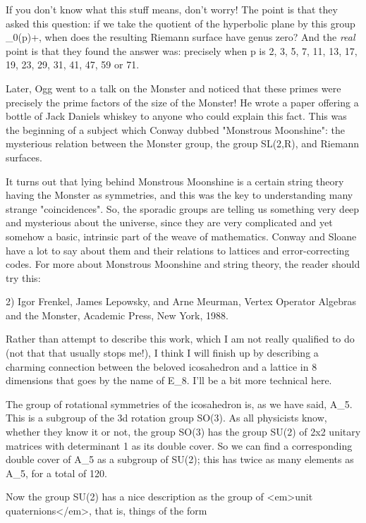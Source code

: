 If you don't know what this stuff means, don't worry! 
The point is that they asked this question: if we take the quotient of the 
hyperbolic plane by this group \Gamma _{0}(p)+, when does the resulting
Riemann surface have genus zero?  And the \emph{real} point
is that they found the answer was: precisely when p is 2, 3, 5, 7, 
11, 13, 17, 19, 23, 29, 31, 41, 47, 59 or 71. 

Later, Ogg went to a talk on the Monster and noticed that these
primes were precisely the prime factors of the size of the Monster!
He wrote a paper offering a bottle of Jack Daniels whiskey to 
anyone who could explain this fact.  This was the beginning of a 
subject which Conway dubbed "Monstrous Moonshine": 
the mysterious relation between the Monster group, the group 
SL(2,R), and Riemann surfaces.  

It turns out that lying behind Monstrous Moonshine is a certain
string theory having the Monster as symmetries, and this was
the key to understanding many strange "coincidences". 
So, the sporadic groups are telling us something very deep and
mysterious about the universe, since they are very complicated and yet
somehow a basic, intrinsic part of the weave of mathematics.  Conway
and Sloane have a lot to say about them and their relations to lattices
and error-correcting codes.   For more about Monstrous Moonshine
and string theory, the reader should try this:

2) Igor Frenkel, James Lepowsky, and Arne Meurman, Vertex Operator
Algebras and the Monster, Academic Press, New York, 1988.

Rather than attempt to describe this work, which I am not really
qualified to do (not that that usually stops me!), I think I will finish
up by describing a charming connection between the beloved icosahedron
and a lattice in 8 dimensions that goes by the name of E_{8}.
I'll be a bit more technical here.


The group of rotational symmetries of the icosahedron is, as we have
said, A_{5}.  This is a subgroup of the 3d rotation group SO(3).
As all physicists know, whether they know it or not, the group SO(3) has
the group SU(2) of 2x2 unitary matrices with determinant 1 as its double
cover.  So we can find a corresponding double cover of A_{5} 
as a subgroup
of SU(2); this has twice as many elements as A_{5}, for a total of 120.

Now the group SU(2) has a nice description as the group of <em>unit
quaternions</em>, that is, things of the form
 
